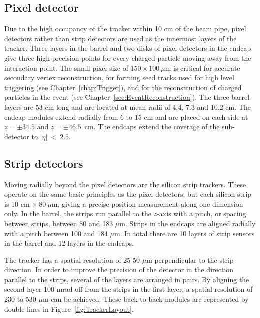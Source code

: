 \subsection{Pixel detector}
\label{sec:TrackerPixel}

Due to the high occupancy of the tracker within 10 cm of the beam pipe, pixel detectors rather than strip detectors are used as the innermost layers of the tracker. Three layers in the barrel and two disks of pixel detectors in the endcap give three high-precision points for every charged particle moving away from the interaction point. The small pixel size of $150\times100~\mu$m is critical for accurate secondary vertex reconstruction, for forming seed tracks used for high level triggering (see Chapter~\ref{chap:Trigger}), and for the reconstruction of charged particles in the event (see Chapter~\ref{sec:EventReconstruction}). The three barrel layers are 53 cm long and are located at mean radii of 4.4, 7.3 and 10.2 cm. The endcap modules extend radially from 6 to 15 cm and are placed on each side at $z=\pm34.5$ and $z=\pm46.5$~cm. The endcaps extend the coverage of the sub-detector to $|\eta|~<~ 2.5$. 

\subsection{Strip detectors}
\label{sec:TrackStrip}
Moving radially beyond the pixel detectors are the silicon strip trackers. These operate on the same basic principles as the pixel detectors, but each silicon strip is 10 cm $\times~80~\mu$m, giving a precise position measurement along one dimension only. In the barrel, the strips run parallel to the $z$-axis with a pitch, or spacing between strips, between 80 and 183 $\mu$m. Strips in the endcaps are aligned radially with a pitch between 100 and 184 $\mu$m. In total there are 10 layers of strip sensors in the barrel and 12 layers in the endcaps.

The tracker has a spatial resolution of 25-50 $\mu$m perpendicular to the strip direction. In order to improve the precision of the detector in the direction parallel to the strips, several of the layers are arranged in pairs. By aligning the second layer 100 mrad off from the strips in the first layer, a spatial resolution of 230 to 530 $\mu$m can be achieved. These back-to-back modules are represented by double lines in Figure~\ref{fig:TrackerLayout}.

